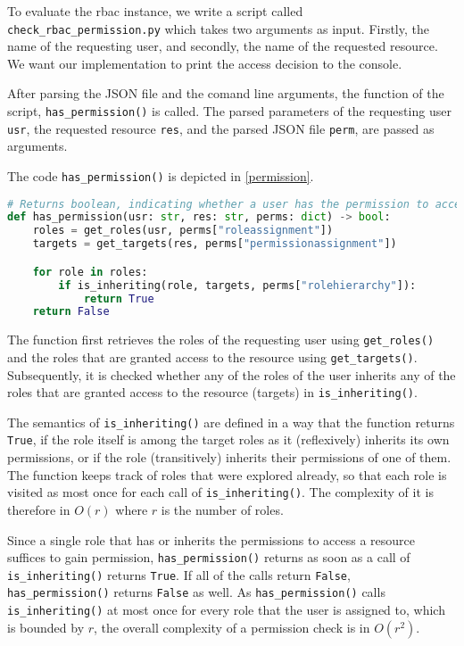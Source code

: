 \documentclass{semdoc}
\begin{document}
To evaluate the \gls{rbac} instance, we write a script called \texttt{check\_rbac\_permission.py} which takes two arguments as input. Firstly, the name of the requesting user, and secondly, the name of the requested resource.
We want our implementation to print the access decision to the console.

After parsing the JSON file and the comand line arguments, the function of the script, \texttt{has\_permission()} is called. 
The parsed parameters of the requesting user \texttt{usr}, the requested resource \texttt{res}, and the parsed JSON file \texttt{perm}, are passed as arguments. 

The code \texttt{has\_permission()} is depicted in \cref{permission}.

\begin{lstlisting}[float, language=python, label={permission}, caption={\texttt{has\_permission()} for the RBAC instance}]
# Returns boolean, indicating whether a user has the permission to access the object
def has_permission(usr: str, res: str, perms: dict) -> bool:
    roles = get_roles(usr, perms["roleassignment"])
    targets = get_targets(res, perms["permissionassignment"])

    for role in roles:
        if is_inheriting(role, targets, perms["rolehierarchy"]):
            return True
    return False
\end{lstlisting}

The function first retrieves the roles of the requesting user using \texttt{get\_roles()} and the roles that are granted access to the resource using \texttt{get\_targets()}.
Subsequently, it is checked whether any of the roles of the user inherits any of the roles that are granted access to the resource (targets) in \texttt{is\_inheriting()}.

The semantics of \texttt{is\_inheriting()} are defined in a way that the function returns \texttt{True}, if the role itself is among the target roles as it (reflexively) inherits its own permissions, or if the role (transitively) inherits their permissions of one of them. 
The function keeps track of roles that were explored already, so that each role is visited as most once for each call of \texttt{is\_inheriting()}. 
The complexity of it is therefore in $O(r)$ where $r$ is the number of roles.  

Since a single role that has or inherits the permissions to access a resource suffices to gain permission, \texttt{has\_permission()} returns as soon as a call of \texttt{is\_inheriting()} returns \texttt{True}.
If all of the calls return \texttt{False}, \texttt{has\_permission()} returns \texttt{False} as well.
As \texttt{has\_permission()} calls \texttt{is\_inheriting()} at most once for every role that the user is assigned to, which is bounded by $r$, the overall complexity of a permission check is in $O(r^2)$.
\end{document}
